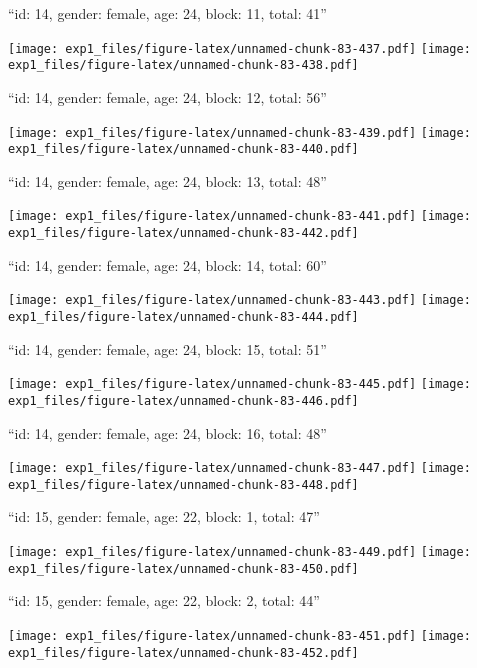 \documentclass[11pt,,]{article}
\begin{document}
\newpage
[1] 

``id: 14, gender: female, age: 24, block: 11, total: 41''

\texttt{[image: exp1\_files/figure-latex/unnamed-chunk-83-437.pdf]}
\texttt{[image: exp1\_files/figure-latex/unnamed-chunk-83-438.pdf]}

\newpage
[1] 

``id: 14, gender: female, age: 24, block: 12, total: 56''

\texttt{[image: exp1\_files/figure-latex/unnamed-chunk-83-439.pdf]}
\texttt{[image: exp1\_files/figure-latex/unnamed-chunk-83-440.pdf]}

\newpage
[1] 

``id: 14, gender: female, age: 24, block: 13, total: 48''

\texttt{[image: exp1\_files/figure-latex/unnamed-chunk-83-441.pdf]}
\texttt{[image: exp1\_files/figure-latex/unnamed-chunk-83-442.pdf]}

\newpage
[1] 

``id: 14, gender: female, age: 24, block: 14, total: 60''

\texttt{[image: exp1\_files/figure-latex/unnamed-chunk-83-443.pdf]}
\texttt{[image: exp1\_files/figure-latex/unnamed-chunk-83-444.pdf]}

\newpage
[1] 

``id: 14, gender: female, age: 24, block: 15, total: 51''

\texttt{[image: exp1\_files/figure-latex/unnamed-chunk-83-445.pdf]}
\texttt{[image: exp1\_files/figure-latex/unnamed-chunk-83-446.pdf]}

\newpage
[1] 

``id: 14, gender: female, age: 24, block: 16, total: 48''

\texttt{[image: exp1\_files/figure-latex/unnamed-chunk-83-447.pdf]}
\texttt{[image: exp1\_files/figure-latex/unnamed-chunk-83-448.pdf]}

\newpage
[1] 

``id: 15, gender: female, age: 22, block: 1, total: 47''

\texttt{[image: exp1\_files/figure-latex/unnamed-chunk-83-449.pdf]}
\texttt{[image: exp1\_files/figure-latex/unnamed-chunk-83-450.pdf]}

\newpage
[1] 

``id: 15, gender: female, age: 22, block: 2, total: 44''

\texttt{[image: exp1\_files/figure-latex/unnamed-chunk-83-451.pdf]}
\texttt{[image: exp1\_files/figure-latex/unnamed-chunk-83-452.pdf]}
\end{document}

